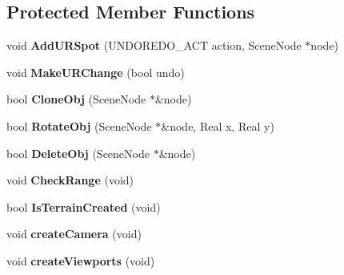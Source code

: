 \subsection*{Protected Member Functions}
\begin{DoxyCompactItemize}
\item 
\hypertarget{class_p_f_d_application_a4cb1e8c64214e450b43d0995b10d2813}{
void {\bfseries AddURSpot} (UNDOREDO\_\-ACT action, SceneNode $\ast$node)}
\label{class_p_f_d_application_a4cb1e8c64214e450b43d0995b10d2813}

\item 
\hypertarget{class_p_f_d_application_af63cde7dec44aa18a697e3023ddf5a6e}{
void {\bfseries MakeURChange} (bool undo)}
\label{class_p_f_d_application_af63cde7dec44aa18a697e3023ddf5a6e}

\item 
\hypertarget{class_p_f_d_application_a5c2e3b61afcc34680f88ec98ef436e9f}{
bool {\bfseries CloneObj} (SceneNode $\ast$\&node)}
\label{class_p_f_d_application_a5c2e3b61afcc34680f88ec98ef436e9f}

\item 
\hypertarget{class_p_f_d_application_a783d436dd14364de92f4a0de30b04eb2}{
bool {\bfseries RotateObj} (SceneNode $\ast$\&node, Real x, Real y)}
\label{class_p_f_d_application_a783d436dd14364de92f4a0de30b04eb2}

\item 
\hypertarget{class_p_f_d_application_ab9f131bd1d7f981b630bb2d5d437676d}{
bool {\bfseries DeleteObj} (SceneNode $\ast$\&node)}
\label{class_p_f_d_application_ab9f131bd1d7f981b630bb2d5d437676d}

\item 
\hypertarget{class_p_f_d_application_a756e6798948d1f9817ab0d29c731a9af}{
void {\bfseries CheckRange} (void)}
\label{class_p_f_d_application_a756e6798948d1f9817ab0d29c731a9af}

\item 
\hypertarget{class_p_f_d_application_a93bdd00ee89f748c3258ee8669876824}{
bool {\bfseries IsTerrainCreated} (void)}
\label{class_p_f_d_application_a93bdd00ee89f748c3258ee8669876824}

\item 
\hypertarget{class_p_f_d_application_a07a6fdd19f2a6f0a0493d9242deb3932}{
void {\bfseries createCamera} (void)}
\label{class_p_f_d_application_a07a6fdd19f2a6f0a0493d9242deb3932}

\item 
\hypertarget{class_p_f_d_application_adf8941dbcc0871b4403b528b8bc34ce4}{
void {\bfseries createViewports} (void)}
\label{class_p_f_d_application_adf8941dbcc0871b4403b528b8bc34ce4}


\end{DoxyCompactItemize}
